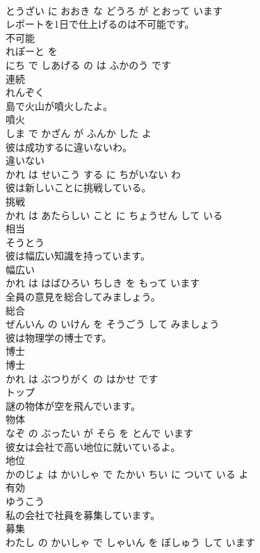 \documentclass[8pt]{extreport}
\begin{document}
\begin{CJK}{UTF8}{min}
\\	とうざい に おおき な どうろ が とおって います			
\\	レポートを1日で仕上げるのは不可能です。	
\\	不可能 
\\	れぽーと を 
\\	にち で しあげる の は ふかのう です			
\\	連続	
\\	れんぞく			
\\	島で火山が噴火したよ。	
\\	噴火 
\\	しま で かざん が ふんか した よ			
\\	彼は成功するに違いないわ。	
\\	違いない 
\\	かれ は せいこう する に ちがいない わ			
\\	彼は新しいことに挑戦している。	
\\	挑戦 
\\	かれ は あたらしい こと に ちょうせん して いる			
\\	相当	
\\	そうとう			
\\	彼は幅広い知識を持っています。	
\\	幅広い 
\\	かれ は はばひろい ちしき を もって います			
\\	全員の意見を総合してみましょう。	
\\	総合 
\\	ぜんいん の いけん を そうごう して みましょう			
\\	彼は物理学の博士です。	
\\	博士 
\\	博士 
\\	かれ は ぶつりがく の はかせ です			
\\	トップ	
\\	謎の物体が空を飛んでいます。	
\\	物体 
\\	なぞ の ぶったい が そら を とんで います			
\\	彼女は会社で高い地位に就いているよ。	
\\	地位 
\\	かのじょ は かいしゃ で たかい ちい に ついて いる よ			
\\	有効	
\\	ゆうこう			
\\	私の会社で社員を募集しています。	
\\	募集 
\\	わたし の かいしゃ で しゃいん を ぼしゅう して います			

\end{CJK}
\end{document}
